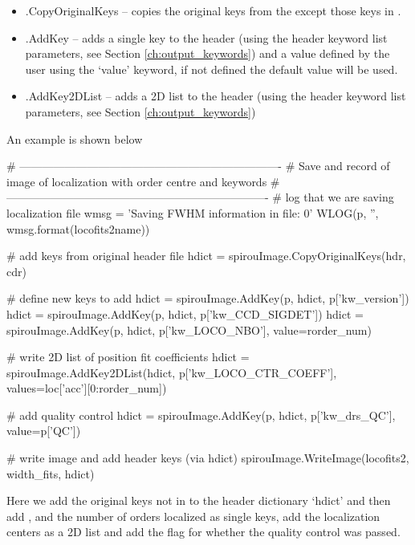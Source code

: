 \begin{itemize}
	\item \spirouImage.CopyOriginalKeys -- copies the original keys from the  except those keys in .

	\item \spirouImage.AddKey -- adds a single key to the header (using the header keyword list parameters, see Section \ref{ch:output_keywords}) and a value defined by the user using the `value' keyword, if not defined the default value will be used.

	\item \spirouImage.AddKey2DList -- adds a 2D list to the header (using the header keyword list parameters, see Section \ref{ch:output_keywords})
\end{itemize}

\vspace{0.5cm}
\begin{minipage}{\textwidth}
\noindent An example is shown below
\begin{pythonbox}
# ----------------------------------------------------------------------
# Save and record of image of localization with order centre and keywords
# ----------------------------------------------------------------------
# log that we are saving localization file
wmsg = 'Saving FWHM information in file: {0}'
WLOG(p, '', wmsg.format(locofits2name))

# add keys from original header file
hdict = spirouImage.CopyOriginalKeys(hdr, cdr)

# define new keys to add
hdict = spirouImage.AddKey(p, hdict, p['kw_version'])
hdict = spirouImage.AddKey(p, hdict, p['kw_CCD_SIGDET'])
hdict = spirouImage.AddKey(p, hdict, p['kw_LOCO_NBO'], value=rorder_num)

# write 2D list of position fit coefficients
hdict = spirouImage.AddKey2DList(hdict, p['kw_LOCO_CTR_COEFF'],
                                 values=loc['acc'][0:rorder_num])

# add quality control
hdict = spirouImage.AddKey(p, hdict, p['kw_drs_QC'], value=p['QC'])

# write image and add header keys (via hdict)
spirouImage.WriteImage(locofits2, width_fits, hdict)
\end{pythonbox}
\begin{note}
Here we add the original keys not in  to the header dictionary `hdict' and then add ,  and  {the number of orders localized} as single keys, add the localization centers as a 2D list and add the flag for whether the quality control was passed.
\end{note}
\end{minipage}

